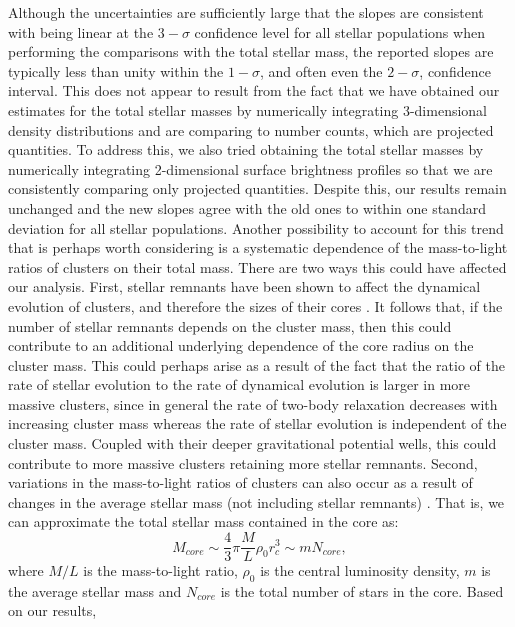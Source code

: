 Although the uncertainties are sufficiently large that the slopes are
consistent with being linear at the $3-\sigma$ confidence level for
all stellar populations when 
performing the comparisons with the total stellar mass, the reported
slopes are typically less than unity within the $1-\sigma$, and often 
even the $2-\sigma$, confidence interval.  This does not appear 
to result from the fact that we have 
obtained our estimates for the total stellar masses 
by numerically integrating 3-dimensional density distributions and are
comparing to number counts, which are projected quantities.  To
address this, we also tried obtaining the total stellar masses by
numerically integrating 2-dimensional surface brightness profiles so
that we are consistently comparing only projected quantities.  Despite
this, our results remain unchanged and the new slopes agree with the 
old ones to within 
one standard deviation for all stellar populations.  Another
possibility to account for this trend that is perhaps worth 
considering is a systematic dependence of the mass-to-light
ratios of clusters on their total mass.  There are two ways this could
have affected our analysis.  First, stellar remnants have been shown to 
affect the dynamical evolution of clusters, and therefore the sizes of
their cores \citep[e.g.][]{lee91, trenti10}.  It follows that, if the
number of stellar remnants depends on the cluster mass, then this
could contribute to an additional underlying dependence of 
the core radius on the cluster mass.  This could perhaps
arise as a result of the fact that the ratio of the rate of stellar
evolution to the rate of dynamical evolution is larger in more massive
clusters, since in general the rate of two-body relaxation decreases with
increasing cluster mass whereas the rate of stellar evolution is
independent of the cluster mass.  Coupled with their deeper gravitational
potential wells, this could contribute to more massive clusters
retaining more stellar remnants.  Second, variations in the
mass-to-light ratios of clusters can also occur as a result of 
changes in the average stellar mass (not including stellar remnants)
\citep{kruijssen09}.  That is, we can approximate the total stellar
mass contained in the core as:
\begin{equation}
\label{eqn:M_core4}
M_{core} \sim \frac{4}{3}{\pi}\frac{M}{L}\rho_0r_c^3 \sim mN_{core},
\end{equation}
where $M/L$ is the mass-to-light ratio, $\rho_0$ is the central 
luminosity density, $m$ is the average stellar mass and $N_{core}$
is the total number of stars in the core.  Based on our results,
